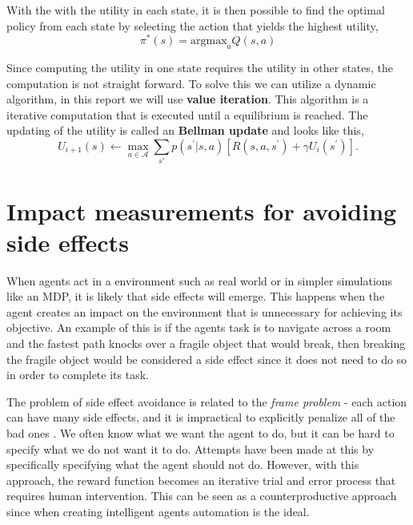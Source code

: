 \documentclass[12pt,A4]{report}
\theoremstyle{definition}
\begin{document}
With the with the utility in each state, it is then possible to find the optimal policy from each state by selecting the action that yields the highest utility,
\[ \pi^*(s) = \text{argmax}_a Q(s,a) \]

Since computing the utility in one state requires the utility in other states, the computation is not straight forward. To solve this we can utilize a dynamic algorithm, in this report we will use \textbf{value iteration}. This algorithm is a iterative computation that is executed until a equilibrium is reached. The updating of the utility is called an \textbf{Bellman update} and looks like this,
\[U_{i+1}(s) \leftarrow \max_{a\in\mathcal{A}} \sum_{s\prime} p(s^\prime|s,a)[R(s,a,s^\prime) + \gamma U_i(s^\prime)].\]




\section{Impact measurements for avoiding side effects}
When agents act in a environment such as real world or in simpler simulations like an MDP, it is likely that side effects will emerge. This happens when the agent creates an impact on the environment that is unnecessary for achieving its objective. An example of this is if the agents task is to navigate across a room and the fastest path knocks over a fragile object that would break, then breaking the fragile object would be considered a side effect since it does not need to do so in order to complete its task. 

The problem of side effect avoidance is related to the \textit{frame problem} - each action can have many side effects, and it is impractical to explicitly penalize all of the bad ones \autocite{The Frame Problem in Artificial Intelligence, Frank M Brown}. We often know what we want the agent to do, but it can be hard to specify what we do not want it to do. Attempts have been made at this by specifically specifying what the agent should not do\autocite{Zhang et al}. However, with this approach, the reward function becomes an iterative trial and error process that requires human intervention. This can be seen as a counterproductive approach since when creating intelligent agents automation is the ideal. 
\end{document}
